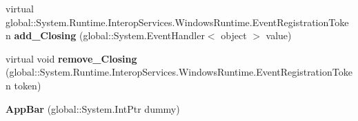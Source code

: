\begin{DoxyCompactItemize}
virtual global\+::\+System.\+Runtime.\+Interop\+Services.\+Windows\+Runtime.\+Event\+Registration\+Token {\bfseries add\+\_\+\+Closing} (global\+::\+System.\+Event\+Handler$<$ object $>$ value)
\item 
\mbox{\label{class_windows_1_1_u_i_1_1_xaml_1_1_controls_1_1_app_bar_a4c8dc6e33234645dfc8de750f6172acc}} 
virtual void {\bfseries remove\+\_\+\+Closing} (global\+::\+System.\+Runtime.\+Interop\+Services.\+Windows\+Runtime.\+Event\+Registration\+Token token)
\item 
\mbox{\label{class_windows_1_1_u_i_1_1_xaml_1_1_controls_1_1_app_bar_a7504764229ad22d4e22e97ea76d33d92}} 
{\bfseries App\+Bar} (global\+::\+System.\+Int\+Ptr dummy)
\end{DoxyCompactItemize}
